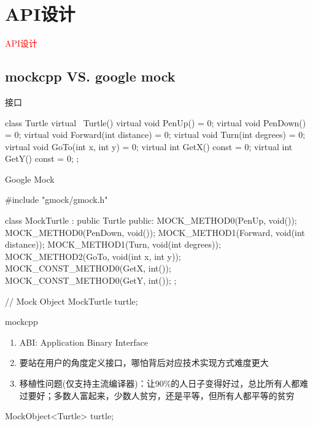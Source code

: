 \section{API设计}
\label{sec:api-design}

\begin{frame}
  \begin{center}
    \Huge{\textcolor{red}{API设计}}
  \end{center}
\end{frame}

\subsection{mockcpp VS. google mock}

\begin{frame}[fragile]{接口}
  \begin{c++}
class Turtle {
  virtual ~Turtle() {}
  virtual void PenUp() = 0;
  virtual void PenDown() = 0;
  virtual void Forward(int distance) = 0;
  virtual void Turn(int degrees) = 0;
  virtual void GoTo(int x, int y) = 0;
  virtual int GetX() const = 0;
  virtual int GetY() const = 0;  
};
  \end{c++}
\end{frame}

\begin{frame}[fragile]{Google Mock}
  \begin{c++}
#include "gmock/gmock.h"

class MockTurtle : public Turtle {
 public:
  MOCK_METHOD0(PenUp, void());
  MOCK_METHOD0(PenDown, void());
  MOCK_METHOD1(Forward, void(int distance));
  MOCK_METHOD1(Turn, void(int degrees));
  MOCK_METHOD2(GoTo, void(int x, int y));
  MOCK_CONST_METHOD0(GetX, int());
  MOCK_CONST_METHOD0(GetY, int());
};

// Mock Object
MockTurtle turtle;
  \end{c++}
\end{frame}

\begin{frame}[fragile]{mockcpp}
\begin{enumerate}
  \item ABI: Application Binary Interface
  \item 要站在用户的角度定义接口，哪怕背后对应技术实现方式难度更大
  \item 移植性问题(仅支持主流编译器)：让90\%的人日子变得好过，总比所有人都难过要好；多数人富起来，少数人贫穷，还是平等，但所有人都平等的贫穷
\end{enumerate}

  \begin{c++}
MockObject<Turtle> turtle;
  \end{c++}
\end{frame}

